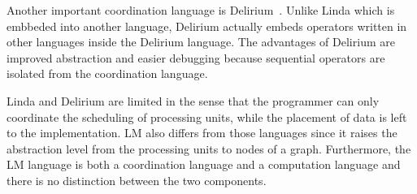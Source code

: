 Another important coordination language is Delirium~\cite{Delirium}. Unlike
Linda which is embbeded into another language, Delirium actually embeds
operators written in other languages inside the Delirium language.
The advantages of Delirium are improved abstraction
and easier debugging because sequential operators are isolated from the
coordination language.

Linda and Delirium are limited in the sense that the programmer can only
coordinate the scheduling of processing units, while the placement of data is
left to the implementation. LM also differs from those languages since it
raises the abstraction level from the processing units to nodes of a graph.
Furthermore, the LM language is both a coordination language and a computation
language and there is no distinction between the two components.

\iffalse
GraphLab~\cite{GraphLab2010} is a C++ framework for developing parallel machine
learning algorithms. GraphLab allows nodes to
have read/write access to different scopes through different concurrent access
models in order to balance performance and data consistency. While some programs
only need to access the local node's data, others may need to update edge
information. Each consistency model will provide different guarantees that are
better adapted to some algorithms. GraphLab provides different schedulers
that dictate the order in which node's are computed, which is a rudimentary form
of coordination. Later in this paper, we will show how certain GraphLab's
schedulers can be easily implemented in LM through the use of coordination
facts.
\fi
